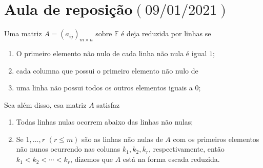 \chapter{Aula de reposição\quad$\left(09/01/2021\right)$}

\begin{definition}
  Uma matriz $A={\left(a_{ij}\right)}_{m\times n}$ sobre $\mathbb{F}$
  é deja reduzida por linhas se

  \begin{enumerate}
    \item

          O primeiro elemento não nulo de cada linha não nula é
          igual $1$;

    \item

          cada columna que possui o primeiro elemento não nulo de

    \item

          uma linha não possui todos os outros elementos iguais a
          $0$;
  \end{enumerate}


  Sea além disso, esa matriz $A$ satisfaz

  \begin{enumerate}

    \item

          Todas linhas nulas ocorrem abaixo das linhas não nulas;

    \item

          Se $1,\ldots,r$ $\left(r\leq m\right)$ são as linhas não
          nulas de $A$ com os primeiros elementos não nunos ocurrendo
          nas colunas $k_{1},k_{2},k_{r}$, respectivamente, então
          $k_{1}<k_{2}<\cdots<k_{r}$, dizemos que $A$ está na forma
          escada reduzida.
  \end{enumerate}
\end{definition}

